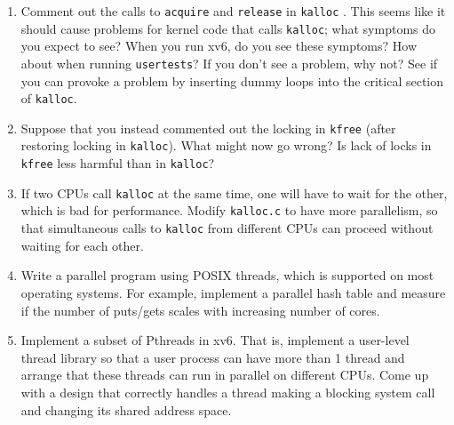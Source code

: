 \begin{enumerate}
  
\item Comment out the calls to
\lstinline{acquire}
and
\lstinline{release}
in
\lstinline{kalloc}
.
This seems like it should cause problems for
kernel code that calls
\lstinline{kalloc};
what symptoms do you expect to see?
When you run xv6, do you see these symptoms?
How about when running
\lstinline{usertests}?
If you don't see a problem, why not?
See if you can provoke a problem by inserting
dummy loops into the critical section of
\lstinline{kalloc}.

\item Suppose that you instead commented out the
locking in
\lstinline{kfree} 
(after restoring locking in
\lstinline{kalloc}).
What might now go wrong? Is lack of locks in
\lstinline{kfree}
less harmful than in
\lstinline{kalloc}?

\item If two CPUs call
\lstinline{kalloc}
at the same time, one will have to wait for the other,
which is bad for performance.
Modify 
\lstinline{kalloc.c}
to have more parallelism, so that simultaneous
calls to
\lstinline{kalloc}
from different CPUs can proceed without waiting for each other.

\item Write a parallel program using POSIX threads, which is supported on most
operating systems. For example, implement a parallel hash table and measure if
the number of puts/gets scales with increasing number of cores.

\item Implement a subset of Pthreads in xv6.  That is, implement a user-level
thread library so that a user process can have more than 1 thread and arrange
that these threads can run in parallel on different CPUs.  Come up with a
design that correctly handles a thread making a blocking system call and
changing its shared address space.

\end{enumerate}

